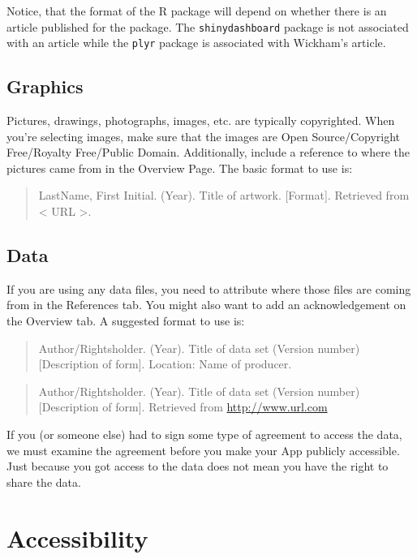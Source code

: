 \documentclass[
]{book}
\begin{document}
Notice, that the format of the R package will depend on whether there is an article published for the package. The \texttt{shinydashboard} package is not associated with an article while the \texttt{plyr} package is associated with Wickham's article.

\hypertarget{graphics-1}{%
\section{Graphics}\label{graphics-1}}

Pictures, drawings, photographs, images, etc. are typically copyrighted. When you're selecting images, make sure that the images are Open Source/Copyright Free/Royalty Free/Public Domain. Additionally, include a reference to where the pictures came from in the Overview Page. The basic format to use is:

\begin{quote}
LastName, First Initial. (Year). Title of artwork. {[}Format{]}. Retrieved from \textless{} URL \textgreater.
\end{quote}

\hypertarget{data}{%
\section{Data}\label{data}}

If you are using any data files, you need to attribute where those files are coming from in the References tab. You might also want to add an acknowledgement on the Overview tab. A suggested format to use is:

\begin{quote}
Author/Rightsholder. (Year). Title of data set (Version number) {[}Description of form{]}. Location: Name of producer.
\end{quote}

\begin{quote}
Author/Rightsholder. (Year). Title of data set (Version number) {[}Description of form{]}. Retrieved from \url{http://www.url.com}
\end{quote}

If you (or someone else) had to sign some type of agreement to access the data, we must examine the agreement before you make your App publicly accessible. Just because you got access to the data does not mean you have the right to share the data.

\hypertarget{accessibility}{%
\chapter{Accessibility}\label{accessibility}}
\end{document}

